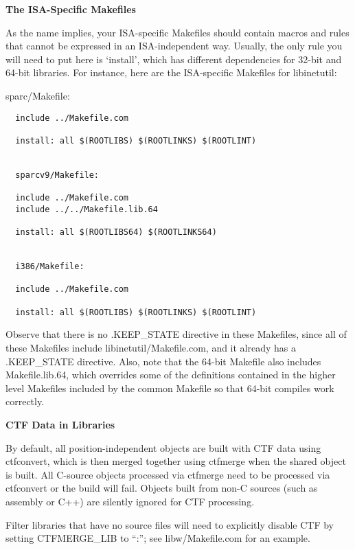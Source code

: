 \documentclass{article}
\begin{document}
\vspace{0.2cm}
{\bf The ISA-Specific Makefiles}

\vspace{0.2cm}
As the name implies, your ISA-specific Makefiles should contain macros and
rules that cannot be expressed in an ISA-independent way. Usually, the only
rule you will need to put here is `install', which has different dependencies
for 32-bit and 64-bit libraries. For instance, here are the ISA-specific
Makefiles for libinetutil:

\vspace{0.2cm}
sparc/Makefile:

\begin{verbatim}
  include ../Makefile.com

  install: all $(ROOTLIBS) $(ROOTLINKS) $(ROOTLINT)


  sparcv9/Makefile:

  include ../Makefile.com
  include ../../Makefile.lib.64

  install: all $(ROOTLIBS64) $(ROOTLINKS64)


  i386/Makefile:

  include ../Makefile.com

  install: all $(ROOTLIBS) $(ROOTLINKS) $(ROOTLINT)
\end{verbatim}

Observe that there is no .KEEP\_STATE directive in these Makefiles, since all of
these Makefiles include libinetutil/Makefile.com, and it already has a
.KEEP\_STATE directive. Also, note that the 64-bit Makefile also includes
Makefile.lib.64, which overrides some of the definitions contained in the
higher level Makefiles included by the common Makefile so that 64-bit compiles
work correctly.

\vspace{0.1cm}
{\bf CTF Data in Libraries}

\vspace{0.1cm}
By default, all position-independent objects are built with CTF data using
ctfconvert, which is then merged together using ctfmerge when the shared object
is built. All C-source objects processed via ctfmerge need to be processed via
ctfconvert or the build will fail. Objects built from non-C sources (such as
assembly or C++) are silently ignored for CTF processing.

Filter libraries that have no source files will need to explicitly disable CTF
by setting CTFMERGE\_LIB to ``:''; see libw/Makefile.com for an example.
\end{document}
